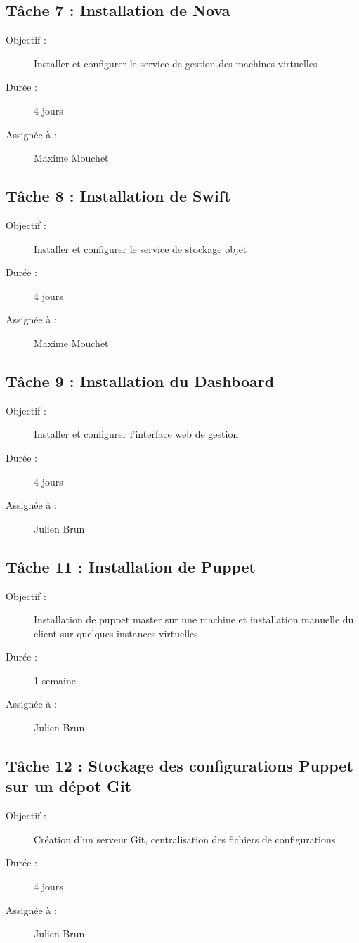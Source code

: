 \documentclass{report}
\begin{document}
\subsection*{Tâche 7 : Installation de Nova}
\begin{description}
\item[Objectif :] Installer et configurer le service de gestion des machines virtuelles
\item[Durée :]  4 jours
\item[Assignée à :] Maxime Mouchet
\end{description}

\subsection*{Tâche 8 : Installation de Swift}
\begin{description}
\item[Objectif :] Installer et configurer le service de stockage objet
\item[Durée :]  4 jours
\item[Assignée à :] Maxime Mouchet
\end{description}

\subsection*{Tâche 9 : Installation du Dashboard}
\begin{description}
\item[Objectif :] Installer et configurer l'interface web de gestion
\item[Durée :]  4 jours
\item[Assignée à :] Julien Brun
\end{description}

\subsection*{Tâche 11 : Installation de Puppet}
\begin{description}
\item[Objectif :] Installation de puppet master sur une machine et installation manuelle du client sur quelques instances virtuelles
\item[Durée :]  1 semaine
\item[Assignée à :] Julien Brun
\end{description}

\subsection*{Tâche 12 : Stockage des configurations Puppet sur un dépot Git}
\begin{description}
\item[Objectif :] Création d’un serveur Git, centralisation des fichiers de configurations
\item[Durée :]  4 jours
\item[Assignée à :] Julien Brun
\end{description}
\end{document}
